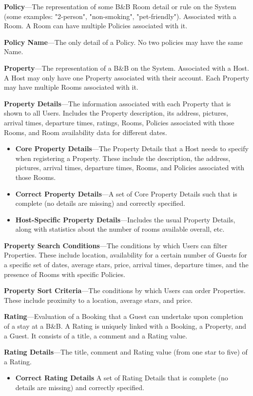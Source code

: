 \textbf{Policy}---The representation of some B\&B Room detail or rule on the System (some examples: "2-person", "non-smoking", "pet-friendly"). Associated with a Room. A Room can have multiple Policies associated with it.

\textbf{Policy Name}---The only detail of a Policy. No two policies may have the same Name.

\textbf{Property}---The representation of a B\&B on the System. Associated with a Host. A Host may only have one Property associated with their account. Each Property may have multiple Rooms associated with it.

\textbf{Property Details}---The information associated with each Property that is shown to all Users. Includes the Property description, its address, pictures, arrival times, departure times, ratings, Rooms, Policies associated with those Rooms, and Room availability data for different dates.
\begin{itemize}
    \item \textbf{Core Property Details}---The Property Details that a Host needs to specify when registering a Property. These include the description, the address, pictures, arrival times, departure times, Rooms, and Policies associated with those Rooms.
    \item \textbf{Correct Property Details}---A set of Core Property Details such that is complete (no details are missing) and correctly specified.
    \item \textbf{Host-Specific Property Details}---Includes the usual Property Details, along with statistics about the number of rooms available overall, etc.
\end{itemize}

\textbf{Property Search Conditions}---The conditions by which Users can filter Properties. These include location, availability for a certain number of Guests for a specific set of dates, average stars, price, arrival times, departure times, and the presence of Rooms with specific Policies.

\textbf{Property Sort Criteria}---The conditions by which Users can order Properties. These include proximity to a location, average stars, and price.

\textbf{Rating}---Evaluation of a Booking that a Guest can undertake upon completion of a stay at a B\&B. A Rating is uniquely linked with a Booking, a Property, and a Guest. It consists of a title, a comment and a Rating value.

\textbf{Rating Details}---The title, comment and Rating value (from one star to five) of a Rating.
\begin{itemize}
    \item \textbf{Correct Rating Details} A set of Rating Details that is complete (no details are missing) and correctly specified.
\end{itemize}

